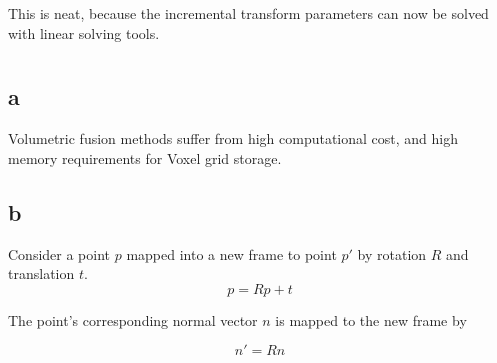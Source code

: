 \documentclass[12pt]{article}
\begin{document}
This is neat, because the incremental transform parameters can now be solved with linear solving tools.
\section{}
\subsection{a}
Volumetric fusion methods suffer from high computational cost, and high memory requirements for Voxel grid storage.
\subsection{b}
Consider a point $p$ mapped into a new frame to point $p'$ by rotation $R$ and translation $t$.
\begin{equation}
p = R p + t
\end{equation}
  
The point's corresponding normal vector $n$ is mapped to the new frame by

\begin{equation}
n' = R n
\end{equation}
\end{document}
